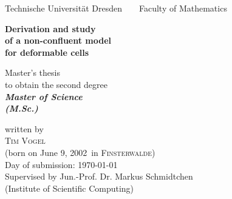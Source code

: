 



\newcommand{\name}{Vogel}
\newcommand{\vorname}{Tim}
\newcommand{\gebdatum}{June 9, 2002}
\newcommand{\ort}{Finsterwalde}
\newcommand{\betreuer}{Jun.-Prof. Dr. Markus Schmidtchen}
\newcommand{\institut}{Institute of Scientific Computing}
\newcommand{\thema}{Derivation and study\\
                    of a non-confluent model\\[0.5em]
                    for deformable cells}
\newcommand{\datum}{\today} %
\newcommand{\studiengang}{Technomathematics}



\thispagestyle{empty}

\begin{center}
{\Large Technische Universit\"{a}t Dresden\  \ \textbullet\ \ Faculty of Mathematics}

\vfil

{\bfseries\Huge\thema}

\vfil
{\LARGE
Master's thesis \\[\bigskipamount]
to obtain the second degree \\[\bigskipamount]
\bfseries{\itshape Master of Science\\
\textup{(}M.Sc.\textup{)}}\\[\bigskipamount]
}



\vfil\vfil

\vfil

written by
\\[\bigskipamount]
\textsc{\vorname} \textsc{\name}
\\[\bigskipamount]
(born on \gebdatum\ in \textsc{\ort})
\\[\bigskipamount]
Day of submission: \datum
\\[\bigskipamount]
Supervised by \betreuer\  \\ (\institut)
\end{center}